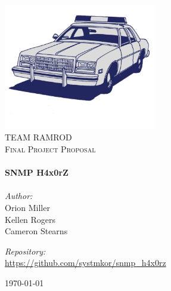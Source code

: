 

\begin{titlepage}
\begin{center}

\includegraphics[width=0.5\textwidth]{./figures/logo.png}
\\[1cm]

\textsc{\LARGE TEAM RAMROD}\\[1.5cm]

\textsc{\Large Final Project Proposal}\\[0.5cm]

\HRule \\[0.4cm]
{\Huge \bfseries SNMP H4x0rZ}\\[0.4cm]
\HRule \\[1.5cm]

{\large
 \emph{Author:}\\
 Orion Miller\\
 Kellen Rogers\\
 Cameron Stearns\\
}

\vfill{}

{\large
 \emph{Repository:}\\
 \url{https://github.com/systmkor/snmp_h4x0rz}
}

\vfill

{\large \today}

\end{center}
\end{titlepage}

